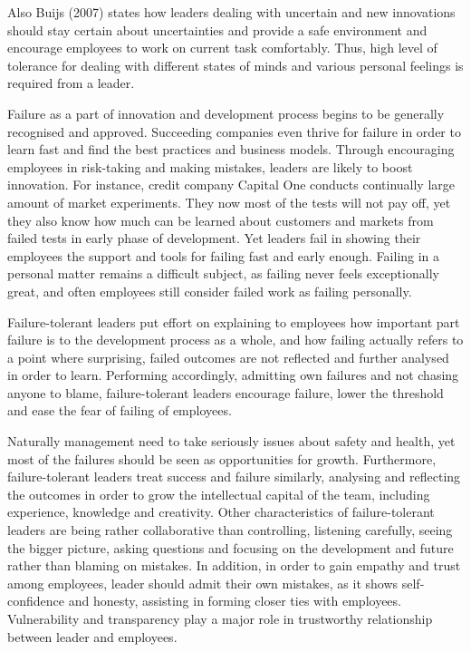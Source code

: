 Also Buijs (2007) \citet{buijs2007innovation} states how leaders dealing with uncertain and new innovations should stay certain about uncertainties and provide a safe environment and encourage employees to work on current task comfortably. Thus, high level of tolerance for dealing with different states of minds and various personal feelings is required from a leader. \citep{buijs2007innovation} 

Failure as a part of innovation and development process begins to be generally recognised and approved. Succeeding companies even thrive for failure in order to learn fast and find the best practices and business models. Through encouraging employees in risk-taking and making mistakes, leaders are likely to boost innovation. For instance, credit company Capital One conducts continually large amount of market experiments. They now most of the tests will not pay off, yet they also know how much can be learned about customers and markets from failed tests in early phase of development. Yet leaders fail in showing their employees the support and tools for failing fast and early enough. Failing in a personal matter remains a difficult subject, as failing never feels exceptionally great, and often employees still consider failed work as failing personally. \citep{farson2002failuretolerantleader}

Failure-tolerant leaders put effort on explaining to employees how important part failure is to the development process as a whole, and how failing actually refers to a point where surprising, failed outcomes are not reflected and further analysed in order to learn. Performing accordingly, admitting own failures and not chasing anyone to blame, failure-tolerant leaders encourage failure, lower the threshold and ease the fear of failing of employees. \citep{farson2002failuretolerantleader}

Naturally management need to take seriously issues about safety and health, yet most of the failures should be seen as opportunities for growth. Furthermore, failure-tolerant leaders treat success and failure similarly, analysing and reflecting the outcomes in order to grow the intellectual capital of the team, including experience, knowledge and creativity. Other characteristics of failure-tolerant leaders are being rather collaborative than controlling, listening carefully, seeing the bigger picture, asking questions and focusing on the development and future rather than blaming on mistakes. In addition, in order to gain empathy and trust among employees, leader should admit their own mistakes, as it shows self-confidence and honesty, assisting in forming closer ties with employees. Vulnerability and transparency play a major role in trustworthy relationship between leader and employees.  \citep{farson2002failuretolerantleader}

